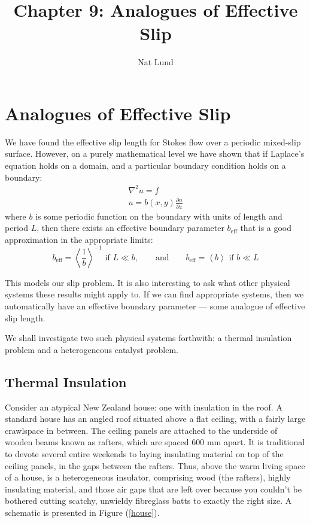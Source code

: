\documentclass[12pt, a4paper, twoside, openright]{book}
\title{Chapter 9: Analogues of Effective Slip}
\author{Nat Lund}
\newcommand{\beff}{\ensuremath{b_{\mathrm{eff}}}}
\begin{document}
\chapter{Analogues of Effective Slip}\label{C:analogs}

We have found the effective slip length for Stokes flow over a periodic mixed-slip surface.  However, on a purely mathematical level we have shown that if Laplace's equation holds on a domain, and a particular boundary condition holds on a boundary:
\begin{gather}
\nabla^2 u = f \\
u = b(x,y) \frac{\partial u}{\partial z}
\end{gather}
where $b$ is some periodic function on the boundary with units of length and period $L$,
then there exists an effective boundary parameter $\beff$ that is a good approximation in the appropriate limits:
\begin{equation}
\beff = \left< \frac{1}{b} \right>^{-1} \text{   if   } L \ll b, \qquad \text{and} \qquad
\beff = \left< b \right> \text{   if   } b \ll L
\end{equation}


This models our slip problem.  It is also interesting to ask what other physical systems these results might apply to.  If we can find appropriate systems, then we automatically have an effective boundary parameter --- some analogue of effective slip length.

We shall investigate two such physical systems forthwith: a thermal insulation problem and a heterogeneous catalyst problem.


\section{Thermal Insulation}

Consider an atypical New Zealand house: one with insulation in the roof.  A standard house has an angled roof situated above a flat ceiling, with a fairly large crawlspace in between.  The ceiling panels are attached to the underside of wooden beams known as rafters, which are spaced 600 mm apart.  It is traditional to devote several entire weekends to laying insulating material on top of the ceiling panels, in the gaps between the rafters.
Thus, above the warm living space of a house, is a heterogeneous insulator, comprising wood (the rafters), highly insulating material, and those air gaps that are left over because you couldn't be bothered cutting scatchy, unwieldy fibreglass batts to exactly the right size.  A schematic is presented in Figure (\ref{house}).
\end{document}

